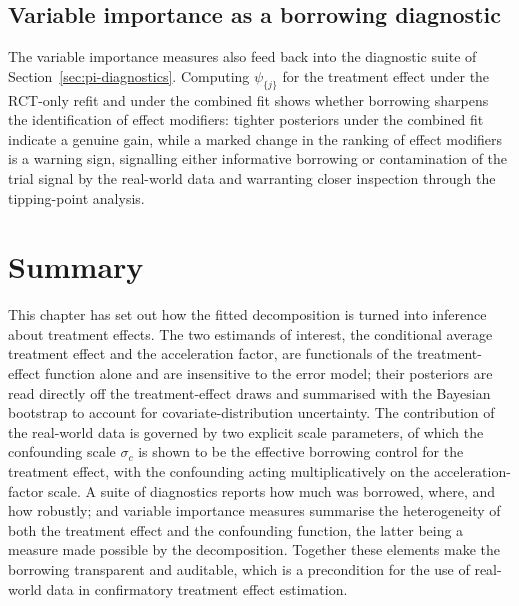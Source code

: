 \subsection{Variable importance as a borrowing diagnostic}

The variable importance measures also feed back into the diagnostic suite of
Section~\ref{sec:pi-diagnostics}. Computing $\psi_{\{j\}}$ for the treatment
effect under the RCT-only refit and under the combined fit shows whether
borrowing sharpens the identification of effect modifiers: tighter posteriors
under the combined fit indicate a genuine gain, while a marked change in the
ranking of effect modifiers is a warning sign, signalling either informative
borrowing or contamination of the trial signal by the real-world data and
warranting closer inspection through the tipping-point analysis.

\section{Summary}
\label{sec:pi-summary}

This chapter has set out how the fitted decomposition is turned into inference
about treatment effects. The two estimands of interest, the conditional average
treatment effect and the acceleration factor, are functionals of the
treatment-effect function alone and are insensitive to the error model; their
posteriors are read directly off the treatment-effect draws and summarised with
the Bayesian bootstrap to account for covariate-distribution uncertainty. The
contribution of the real-world data is governed by two explicit scale
parameters, of which the confounding scale $\sigma_c$ is shown to be the
effective borrowing control for the treatment effect, with the confounding
acting multiplicatively on the acceleration-factor scale. A suite of diagnostics
reports how much was borrowed, where, and how robustly; and variable importance
measures summarise the heterogeneity of both the treatment effect and the
confounding function, the latter being a measure made possible by the
decomposition. Together these elements make the borrowing transparent and
auditable, which is a precondition for the use of real-world data in
confirmatory treatment effect estimation.

